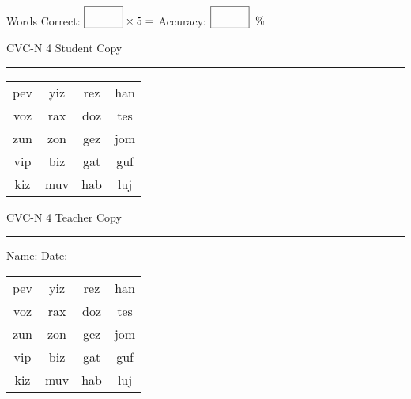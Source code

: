 \documentclass{memoir}
\begin{document}
\small

Words Correct: $\fbox{\phantom{\huge 100}} \times 5 = $ Accuracy: $\fbox{\phantom{\huge 100}}\;\; \%$ 

\vfill

\newpage


\footnotesize \noindent
CVC-N 4 \hfill Student Copy
\smallskip
\hrule

\Large

\setlength{\tabcolsep}{14pt}
\def\arraystretch{2}

{\selectfont


\begin{vplace}[0.5]
\begin{center}
\begin{tabular}{cccc}
pev & yiz & rez & han \\
voz & rax & doz & tes \\
zun & zon & gez & jom \\
vip & biz & gat & guf \\
kiz & muv & hab & luj \\
\end{tabular}
\end{center}
\end{vplace}

}

\newpage

\footnotesize \noindent
CVC-N 4 \hfill Teacher Copy
\smallskip
\hrule

\small

\vfill

\noindent
Name: \underline{\hspace{1.75in}} \hfill Date: \underline{\hspace{1in}}

\Large

{\selectfont


\begin{vplace}[0.5]
\begin{center}
\begin{tabular}{cccc}
pev & yiz & rez & han \\
voz & rax & doz & tes \\
zun & zon & gez & jom \\
vip & biz & gat & guf \\
kiz & muv & hab & luj \\
\end{tabular}
\end{center}
\end{vplace}



}
\end{document}

